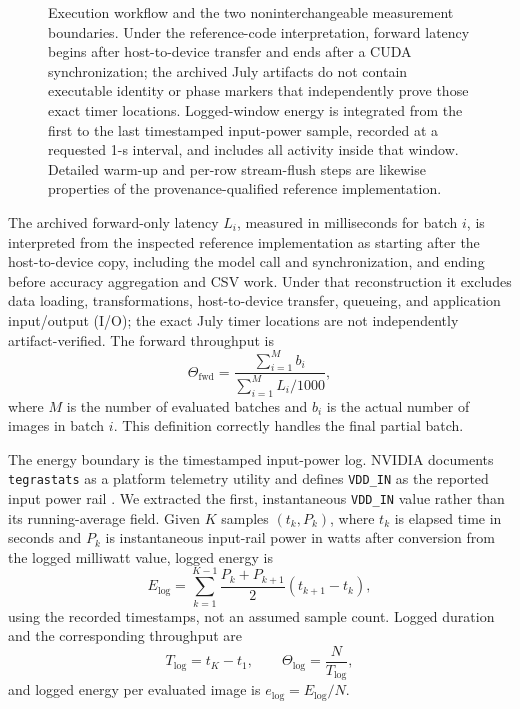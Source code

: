 \documentclass[electronics,article,submit,pdftex,moreauthors]{Definitions/mdpi}
\newcommand{\fwd}{\mathrm{fwd}}
\newcommand{\logwin}{\mathrm{log}}
\begin{document}
\begin{figure}[t]
\centering
\resizebox{\linewidth}{!}{}
\caption{Execution workflow and the two noninterchangeable measurement boundaries. Under the reference-code interpretation, forward latency begins after host-to-device transfer and ends after a CUDA synchronization; the archived July artifacts do not contain executable identity or phase markers that independently prove those exact timer locations. Logged-window energy is integrated from the first to the last timestamped input-power sample, recorded at a requested 1-s interval, and includes all activity inside that window. Detailed warm-up and per-row stream-flush steps are likewise properties of the provenance-qualified reference implementation.}
\label{fig:workflow}
\end{figure}

The archived forward-only latency $L_i$, measured in milliseconds for batch $i$, is interpreted from the inspected reference implementation as starting after the host-to-device copy, including the model call and synchronization, and ending before accuracy aggregation and CSV work. Under that reconstruction it excludes data loading, transformations, host-to-device transfer, queueing, and application input/output (I/O); the exact July timer locations are not independently artifact-verified. The forward throughput is
\begin{equation}
\Theta_{\fwd}=\frac{\sum_{i=1}^{M} b_i}{\sum_{i=1}^{M}L_i/1000},
\label{eq:fwd-throughput}
\end{equation}
where $M$ is the number of evaluated batches and $b_i$ is the actual number of images in batch $i$. This definition correctly handles the final partial batch.

The energy boundary is the timestamped input-power log. NVIDIA documents \texttt{tegrastats} as a platform telemetry utility and defines \texttt{VDD\_IN} as the reported input power rail \cite{nvidiategrastats}. We extracted the first, instantaneous \texttt{VDD\_IN} value rather than its running-average field. Given $K$ samples $(t_k,P_k)$, where $t_k$ is elapsed time in seconds and $P_k$ is instantaneous input-rail power in watts after conversion from the logged milliwatt value, logged energy is
\begin{equation}
E_{\logwin}=\sum_{k=1}^{K-1}\frac{P_k+P_{k+1}}{2}(t_{k+1}-t_k),
\label{eq:energy}
\end{equation}
using the recorded timestamps, not an assumed sample count. Logged duration and the corresponding throughput are
\begin{equation}
T_{\logwin}=t_K-t_1,\qquad
\Theta_{\logwin}=\frac{N}{T_{\logwin}},
\label{eq:logged-throughput}
\end{equation}
and logged energy per evaluated image is $e_{\logwin}=E_{\logwin}/N$.
\end{document}
